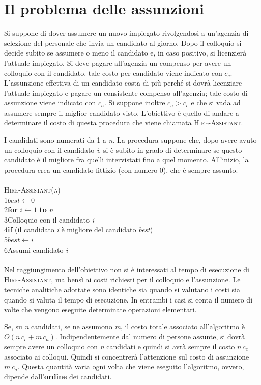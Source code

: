 \documentclass[10pt, a4paper]{report}
\newcommand\firsttab[1][0.5cm]{\hspace*{#1}}
\newcommand\secondtab[1][1cm]{\hspace*{#1}}
\newcommand\thirdtab[1][1.5cm]{\hspace*{#1}}
\begin{document}
\section{Il problema delle assunzioni}
Si suppone di dover assumere un nuovo impiegato rivolgendosi a un'agenzia di selezione del personale che invia un candidato al giorno. Dopo il colloquio si decide subito se assumere o meno il candidato e, in caso positivo, si licenzierà l'attuale impiegato. Si deve pagare all'agenzia un compenso per avere un colloquio con il candidato, tale costo per candidato viene indicato con $c_c$. L'assunzione effettiva di un candidato costa di più perché si dovrà licenziare l'attuale impiegato e pagare un consistente compenso all'agenzia; tale costo di assunzione viene indicato con $c_a$. Si suppone inoltre $c_a > c_c$ e che si vada ad assumere sempre il miglior candidato visto. L'obiettivo è quello di andare a determinare il costo di questa procedura che viene chiamata \textsc{Hire-Assistant}.

I candidati sono numerati da 1 a \textit{n}. La procedura suppone che, dopo avere avuto un colloquio con il candidato \textit{i}, si è subito in grado di determinare se questo candidato è il migliore fra quelli intervistati fino a quel momento. All'inizio, la procedura crea un candidato fittizio (con numero 0), che è sempre assunto.\\\\
\textsc{Hire-Assistant(\textit{n})}\\
1\firsttab $best \leftarrow 0$\\
2\firsttab\textbf{for} $i \leftarrow 1$ \textbf{to} \textit{n}\\
3\secondtab Colloquio con il candidato \textit{i}\\
4\secondtab\textbf{if} (il candidato \textit{i} è migliore del candidato \textit{best})\\
5\thirdtab$best \leftarrow i$\\
6\thirdtab Assumi candidato \textit{i}\\\\
Nel raggiungimento dell'obiettivo non si è interessati al tempo di esecuzione di \textsc{Hire-Assistant}, ma bensì ai costi richiesti per il colloquio e l'assunzione. Le tecniche analitiche adottate sono identiche sia quando si valutano i costi sia quando si valuta il tempo di esecuzione. In entrambi i casi si conta il numero di volte che vengono eseguite determinate operazioni elementari.

Se, su \textit{n} candidati, se ne assumono \textit{m}, il costo totale associato all'algoritmo è $O(n\,c_c + m\,c_a)$. Indipendentemente dal numero di persone assunte, si dovrà sempre avere un colloquio con \textit{n} candidati e quindi si avrà sempre il costo $n\,c_c$ associato ai colloqui. Quindi si concentrerà l'attenzione sul costo di assunzione $m\,c_a$. Questa quantità varia ogni volta che viene eseguito l'algoritmo, ovvero, dipende dall'\textbf{ordine} dei candidati.
\end{document}
